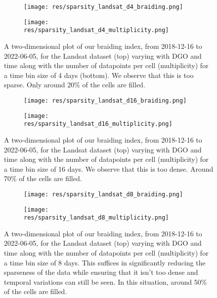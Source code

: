 \documentclass[12pt]{article}
\begin{document}
\begin{figure}[H]
    \centering
    \begin{subfigure}[t]{0.9\textwidth}
        \centering
        \texttt{[image: res/sparsity\_landsat\_d4\_braiding.png]}
    \end{subfigure}
    \begin{subfigure}[t]{0.9\textwidth}
        \centering
        \texttt{[image: res/sparsity\_landsat\_d4\_multiplicity.png]}
    \end{subfigure}
    \caption{A two-dimensional plot of our braiding index, from 2018-12-16 to 2022-06-05, for the Landsat dataset (top) varying with DGO and time along with the number of datapoints per cell (multiplicity) for a time bin size of 4 days (bottom). We observe that this is too sparse. Only around 20\% of the cells are filled.}
    \label{fig:sparsity_discretisation_4}
\end{figure}

\begin{figure}[H]
    \centering
    \begin{subfigure}[t]{0.9\textwidth}
        \centering
        \texttt{[image: res/sparsity\_landsat\_d16\_braiding.png]}
    \end{subfigure}
    \begin{subfigure}[t]{0.9\textwidth}
        \centering
        \texttt{[image: res/sparsity\_landsat\_d16\_multiplicity.png]}
    \end{subfigure}
    \caption{A two-dimensional plot of our braiding index, from 2018-12-16 to 2022-06-05, for the Landsat dataset (top) varying with DGO and time along with the number of datapoints per cell (multiplicity) for a time bin size of 16 days. We observe that this is too dense. Around 70\% of the cells are filled.}
    \label{fig:sparsity_discretisation_16}
\end{figure}

\begin{figure}[H]
    \centering
    \begin{subfigure}[t]{0.9\textwidth}
        \centering
        \texttt{[image: res/sparsity\_landsat\_d8\_braiding.png]}
    \end{subfigure}
    \begin{subfigure}[t]{0.9\textwidth}
        \centering
        \texttt{[image: res/sparsity\_landsat\_d8\_multiplicity.png]}
    \end{subfigure}
    \caption{A two-dimensional plot of our braiding index, from 2018-12-16 to 2022-06-05, for the Landsat dataset (top) varying with DGO and time along with the number of datapoints per cell (multiplicity) for a time bin size of 8 days. This suffices in significantly reducing the sparseness of the data while ensuring that it isn't too dense and temporal variations can still be seen. In this situation, around 50\% of the cells are filled.}
    \label{fig:sparsity_discretisation_8}
\end{figure}
\end{document}
